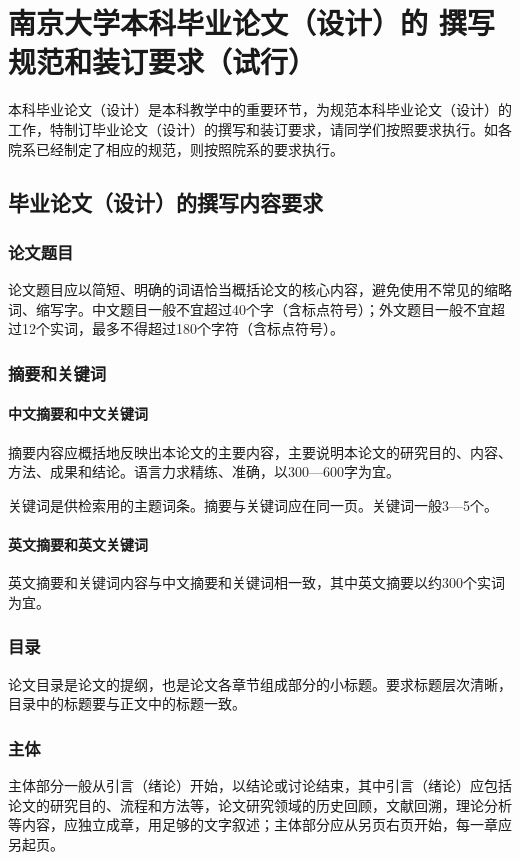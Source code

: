 \chapter{南京大学本科毕业论文（设计）的
撰写规范和装订要求（试行）}
\label{chap:standard}

本科毕业论文（设计）是本科教学中的重要环节，为规范本科毕业论文（设计）的工作，特制订毕业论文（设计）的撰写和装订要求，请同学们按照要求执行。如各院系已经制定了相应的规范，则按照院系的要求执行。

\section{毕业论文（设计）的撰写内容要求}
\subsection{论文题目}
论文题目应以简短、明确的词语恰当概括论文的核心内容，避免使用不常见的缩略词、缩写字。中文题目一般不宜超过40个字（含标点符号）；外文题目一般不宜超过12个实词，最多不得超过180个字符（含标点符号）。
\subsection{摘要和关键词}
\subsubsection{中文摘要和中文关键词}
摘要内容应概括地反映出本论文的主要内容，主要说明本论文的研究目的、内容、方法、成果和结论。语言力求精练、准确，以300—600字为宜。

关键词是供检索用的主题词条。摘要与关键词应在同一页。关键词一般3—5个。

\subsubsection{英文摘要和英文关键词}
英文摘要和关键词内容与中文摘要和关键词相一致，其中英文摘要以约300个实词为宜。

\subsection{目录}
论文目录是论文的提纲，也是论文各章节组成部分的小标题。要求标题层次清晰，目录中的标题要与正文中的标题一致。

\subsection{主体}
主体部分一般从引言（绪论）开始，以结论或讨论结束，其中引言（绪论）应包括论文的研究目的、流程和方法等，论文研究领域的历史回顾，文献回溯，理论分析等内容，应独立成章，用足够的文字叙述；主体部分应从另页右页开始，每一章应另起页。

